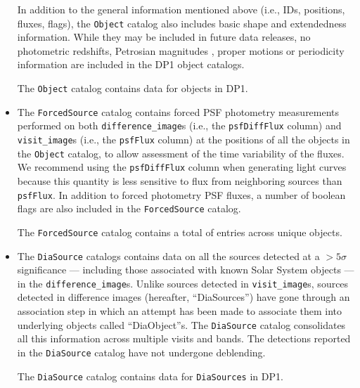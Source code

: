 \begin{itemize}
In addition to the general information mentioned above (i.e., IDs, positions, fluxes, flags), the \texttt{Object} catalog also includes basic \gls{shape} and extendedness information.
While they may be included in future data releases, no photometric redshifts, Petrosian magnitudes \citep{1976ApJ...209L...1P}, proper motions or periodicity information are included in the \gls{DP1} object catalogs.

The \texttt{Object} catalog contains data for \nobjects objects in \gls{DP1}.

\item The \texttt{ForcedSource} catalog \citep{10.71929/rubin/2570327} contains forced \gls{PSF} photometry measurements performed on both \texttt{difference\_image}s (i.e., the \texttt{psfDiffFlux} column) and \texttt{visit\_image}s (i.e., the \texttt{psfFlux} column) at the positions of all the objects in the \texttt{Object} catalog, to allow assessment of the time variability of the fluxes.
We recommend using the \texttt{psfDiffFlux} column when generating light curves because this quantity is less sensitive to \gls{flux} from neighboring sources than \texttt{psfFlux}.
In addition to \gls{forced photometry} \gls{PSF} fluxes, a number of boolean flags are also included in the \texttt{ForcedSource} catalog.

The \texttt{ForcedSource} catalog contains a total of \nforcedsources entries across \nforcedobjects unique objects.

\item The \texttt{DiaSource} catalogs \citep{10.71929/rubin/2570317} contains data on all the sources detected at a $>5\sigma$ significance --- including those associated with known Solar System objects --- in the \texttt{difference\_image}s.
Unlike sources detected in \texttt{visit\_image}s, sources detected in difference images (hereafter, ``DiaSources'') have gone through an association step in which an attempt has been made to associate them into underlying objects called ``DiaObject''s. 
The \texttt{DiaSource} catalog consolidates all this information across multiple visits and bands. 
The detections reported in the \texttt{DiaSource} catalog have not undergone deblending.

The \texttt{DiaSource} catalog contains data for \ndiasources \texttt{DiaSources} in \gls{DP1}.


\end{itemize}
